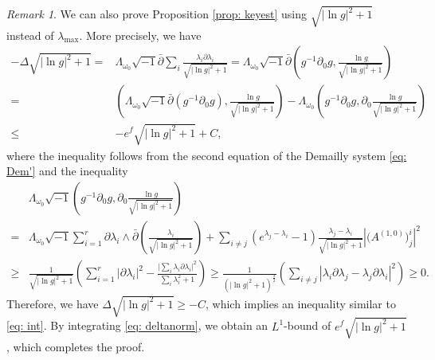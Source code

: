 \documentclass[a4, 12pt, 
]{amsart}
\numberwithin{equation}{section}
\theoremstyle{plain}
\theoremstyle{definition}
\theoremstyle{remark}
\newtheorem{rem}[equation]{Remark}
\begin{document}
    \begin{rem}
        We can also prove Proposition \ref{prop: keyest} using $\sqrt{|\ln g|^2+1}$ instead of $\lambda_{\mathrm{max}}$. More precisely, we have
        \begin{equation}\label{eq: deltanorm}
        \begin{aligned}
                -\Delta\sqrt{|\ln g|^2+1}
                =&\Lambda_{\omega_0}\sqrt{-1}\bar{\partial}\sum_i\frac{\lambda_i\partial\lambda_i}{\sqrt{|\ln g|^2+1}}=\Lambda_{\omega_0}\sqrt{-1}\bar{\partial}\left(g^{-1}\partial_0 g,\frac{\ln g}{\sqrt{|\ln g|^2+1}}\right)\\
                =& \left(\Lambda_{\omega_0}\sqrt{-1}\bar{\partial}\left(g^{-1}\partial_0g\right),\frac{\ln g}{\sqrt{|\ln g|^2+1}}\right)-\Lambda_{\omega_0}\left(g^{-1}\partial_0g,\partial_0\frac{\ln g}{\sqrt{|\ln g|^2+1}}\right)\\
                \le&-e^f\sqrt{|\ln g|^2+1}+C,
        \end{aligned}
        \end{equation}
        where the inequality follows from the second equation of the Demailly system \eqref{eq: Dem'} and the inequality
        \begin{equation*}
            \begin{aligned}
                &\Lambda_{\omega_0}\sqrt{-1}\left(g^{-1}\partial_0g,\partial_0\frac{\ln g}{\sqrt{|\ln g|^2+1}}\right)\\
                =&\Lambda_{\omega_0}\sqrt{-1}\sum_{i=1}^r\partial\lambda_i\wedge\bar{\partial}\left(\frac{\lambda_i}{\sqrt{|\ln g|^2+1}}\right)+\sum_{i\neq j}(e^{\lambda_j-\lambda_i}-1)\frac{\lambda_j-\lambda_i}{\sqrt{|\ln g|^2+1}}\left|\big(A^{(1,0)}\big)^i_j\right|^2\\
                \ge&\frac{1}{\sqrt{|\ln g|^2+1}}\left(\sum_{i=1}^r |\partial\lambda_i|^2-\frac{\big|\sum_i\lambda_i\partial\lambda_i\big|^2}{\sum_i\lambda_i^2+1}\right)
                \ge\frac{1}{(|\ln g|^2+1)^\frac{3}{2}}\left(\sum_{i\neq j}\left|\lambda_i\partial\lambda_j-\lambda_j\partial\lambda_i\right|^2\right)\ge0.
            \end{aligned}
        \end{equation*}
        Therefore, we have $\Delta\sqrt{|\ln g|^2+1}\ge -C$, which implies an inequality similar to \eqref{eq: int}. By integrating \eqref{eq: deltanorm}, we obtain an $L^1$-bound of $e^f\sqrt{|\ln g|^2+1}$, which completes the proof.
    \end{rem}
\end{document}

